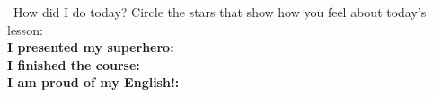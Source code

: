 \vspace{1em}
\begin{grammartip}{ \ How did I do today?}
  Circle the stars that show how you feel about today's lesson:\\[6pt]
  \textbf{I presented my superhero:} \selfcheck[0] \\[4pt]
  \textbf{I finished the course:} \selfcheck[0] \\[4pt]
  \textbf{I am proud of my English!:} \selfcheck[0]
\end{grammartip}
